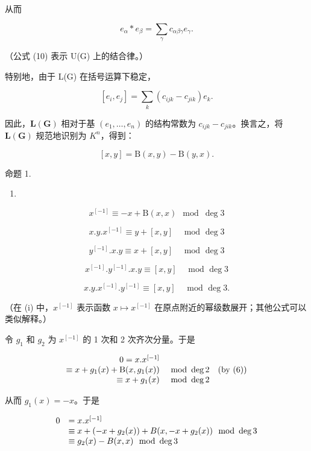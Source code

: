 从而

\[
e _ {\alpha} * e _ {\beta} = \sum_ {\gamma} c _ {\alpha \beta \gamma} e _ {\gamma}.\tag{11}
\]

（公式 (10) 表示 U(G) 上的结合律。）

特别地，由于 L(G) 在括号运算下稳定，

\[
[ e _ {i}, e _ {j} ] = \sum_ {k} (c _ {i j k} - c _ {j i k}) e _ {k}.\tag{12}
\]

因此，\(\mathbf{L}(\mathbf{G})\) 相对于基 \((e_{1},\ldots,e_{n})\) 的结构常数为 \(c_{ijk}-c_{jik}\)。换言之，将 \(\mathbf{L}(\mathbf{G})\) 规范地识别为 \(K^{n}\)，得到：

\[
[ x, y ] = \mathrm{B} (x, y) - \mathrm{B} (y, x).\tag{13}
\]

命题 1.

\begin{enumerate}
\def\labelenumi{(\roman{enumi})}
\tightlist
\item
\end{enumerate}

\[
x ^ {[ - 1 ]} \equiv - x + \mathrm{B} (x, x) \mod \deg 3\tag{i}
\]

\[
x. y. x ^ {[ - 1 ]} \equiv y + [ x, y ] \quad \text {   mod   } \deg 3\tag{ii}
\]

\[
y ^ {[ - 1 ]}. x. y \equiv x + [ x, y ] \quad \text {   mod   } \deg 3\tag{iii}
\]

\[
x ^ {[ - 1 ]}. y ^ {[ - 1 ]}. x. y \equiv [ x, y ] \quad \text {   mod   } \deg 3\tag{iv}
\]

\[
x. y. x ^ {[ - 1 ]}. y ^ {[ - 1 ]} \equiv [ x, y ] \quad \text {   mod   } \deg 3\tag{v}.
\]

（在 (i) 中，\(x^{[-1]}\) 表示函数 \(x \mapsto x^{[-1]}\) 在原点附近的幂级数展开；其他公式可以类似解释。）

令 \(g_{1}\) 和 \(g_{2}\) 为 \(x^{[-1]}\) 的 1 次和 2 次齐次分量。于是

\[
\begin{array}{r l} 0 = x. x ^ {[ - 1 ]} \\ \equiv x + g _ {1} (x) + \mathrm{B} (x, g _ {1} (x)) & \text {   mod   } \deg 2 \quad \text {(by (6))} \\ \equiv x + g _ {1} (x) & \text {   mod   } \deg 2 \end{array}
\]

从而 \(g_{1}(x) = -x\)。于是

\[
\begin{array}{r l} 0 & = x. x ^ {[ - 1 ]} \\ & \equiv x + (- x + g _ {2} (x)) + B (x, - x + g _ {2} (x)) \mod \deg 3 \\ & \equiv g _ {2} (x) - B (x, x) \mod \deg 3 \end{array}
\]

